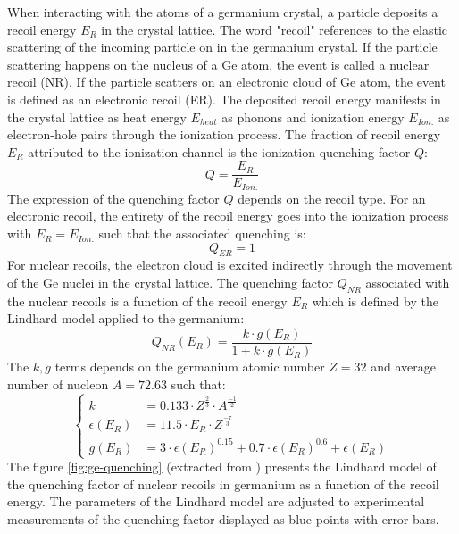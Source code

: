 When interacting with the atoms of a germanium crystal, a particle deposits a recoil energy $E_R$ in the crystal lattice. The word "recoil" references to the elastic scattering of the incoming particle on in the germanium crystal. If the particle scattering happens on the nucleus of a Ge atom, the event is called a nuclear recoil (NR). If the particle scatters on an electronic cloud of Ge atom, the event is defined as an electronic recoil (ER). The deposited recoil energy manifests in the crystal lattice as heat energy $E_{heat}$ as phonons and ionization energy $E_{Ion.}$ as electron-hole pairs through the ionization process. The fraction of recoil energy $E_R$ attributed to the ionization channel is the ionization quenching factor $Q$:
\begin{equation}
\label{eq:quenching}
Q = \frac{E_R}{E_{Ion.}}
\end{equation}
The expression of the quenching factor $Q$ depends on the recoil type. For an electronic recoil, the entirety of the recoil energy goes into the ionization process with $E_R = E_{Ion.}$ such that the associated quenching is:
\begin{equation}
Q_{ER} = 1
\end{equation}
For nuclear recoils, the electron cloud is excited indirectly through the movement of the Ge nuclei in the crystal lattice. The quenching factor $Q_{NR}$ associated with the nuclear recoils is a function of the recoil energy $E_R$ which is defined by the Lindhard model \cite{Lindhard:1963} applied to the germanium:
\begin{equation}
\label{eq:lindhard}
Q_{NR}(E_R) = \frac{k \cdot g(E_R)}{1+k \cdot g(E_R)}
\end{equation}
The $k,g$ terms depends on the germanium atomic number $Z=32$ and average number of nucleon $A=72.63$ such that:
\begin{equation}
\begin{cases}
k &= 0.133 \cdot Z^\frac{2}{3} \cdot A^\frac{-1}{2}
\\
\epsilon(E_R) &= 11.5 \cdot E_R \cdot Z^\frac{-7}{3}
\\
g(E_R) &= 3 \cdot \epsilon(E_R)^{0.15} + 0.7 \cdot\epsilon(E_R)^{0.6} + \epsilon(E_R) 
\end{cases}
\end{equation}
The figure \ref{fig:ge-quenching} (extracted from \cite{Benoit:2006qc}) presents the Lindhard model of the quenching factor of nuclear recoils in germanium as a function of the recoil energy. The parameters of the Lindhard model are adjusted to experimental measurements of the quenching factor displayed as blue points with error bars. 

